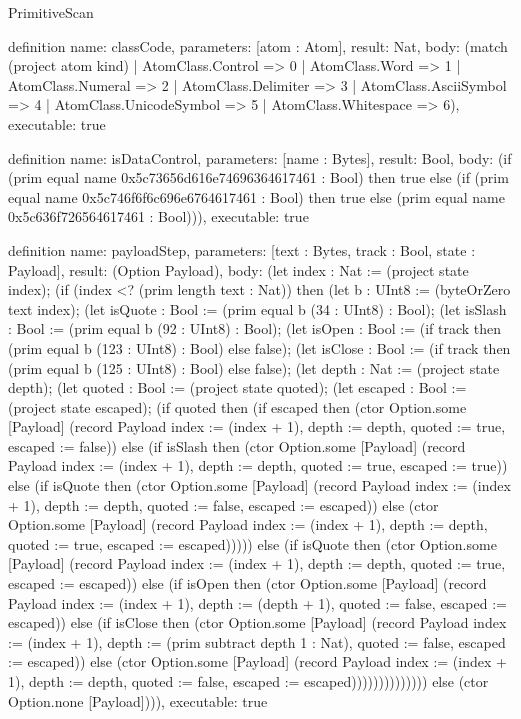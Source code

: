 \begin{lexlean}{PrimitiveScan}
\begin{semanticmodule}
definition{
  name: classCode,
  parameters: [atom : Atom],
  result: Nat,
  body: (match (project atom kind)
    | AtomClass.Control => 0
    | AtomClass.Word => 1
    | AtomClass.Numeral => 2
    | AtomClass.Delimiter => 3
    | AtomClass.AsciiSymbol => 4
    | AtomClass.UnicodeSymbol => 5
    | AtomClass.Whitespace => 6),
  executable: true
}

definition{
  name: isDataControl,
  parameters: [name : Bytes],
  result: Bool,
  body: (if (prim equal name 0x5c73656d616e74696364617461 : Bool) then true else (if (prim equal name 0x5c746f6f6c696e6764617461 : Bool) then true else (prim equal name 0x5c636f726564617461 : Bool))),
  executable: true
}

definition{
  name: payloadStep,
  parameters: [text : Bytes, track : Bool, state : Payload],
  result: (Option Payload),
  body: (let index : Nat := (project state index); (if (index <? (prim length text : Nat)) then (let b : UInt8 := (byteOrZero text index); (let isQuote : Bool := (prim equal b (34 : UInt8) : Bool); (let isSlash : Bool := (prim equal b (92 : UInt8) : Bool); (let isOpen : Bool := (if track then (prim equal b (123 : UInt8) : Bool) else false); (let isClose : Bool := (if track then (prim equal b (125 : UInt8) : Bool) else false); (let depth : Nat := (project state depth); (let quoted : Bool := (project state quoted); (let escaped : Bool := (project state escaped); (if quoted then (if escaped then (ctor Option.some [Payload] (record Payload {index := (index + 1), depth := depth, quoted := true, escaped := false})) else (if isSlash then (ctor Option.some [Payload] (record Payload {index := (index + 1), depth := depth, quoted := true, escaped := true})) else (if isQuote then (ctor Option.some [Payload] (record Payload {index := (index + 1), depth := depth, quoted := false, escaped := escaped})) else (ctor Option.some [Payload] (record Payload {index := (index + 1), depth := depth, quoted := true, escaped := escaped}))))) else (if isQuote then (ctor Option.some [Payload] (record Payload {index := (index + 1), depth := depth, quoted := true, escaped := escaped})) else (if isOpen then (ctor Option.some [Payload] (record Payload {index := (index + 1), depth := (depth + 1), quoted := false, escaped := escaped})) else (if isClose then (ctor Option.some [Payload] (record Payload {index := (index + 1), depth := (prim subtract depth 1 : Nat), quoted := false, escaped := escaped})) else (ctor Option.some [Payload] (record Payload {index := (index + 1), depth := depth, quoted := false, escaped := escaped})))))))))))))) else (ctor Option.none [Payload]))),
  executable: true
}


\end{semanticmodule}
\end{lexlean}

